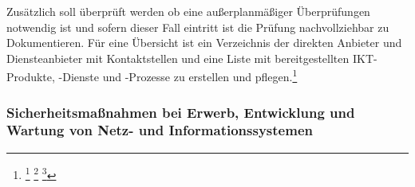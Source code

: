 \documentclass[11pt,a4paper,hidelinks]{article}   %
\begin{document}
Zusätzlich soll überprüft werden ob eine außerplanmäßiger Überprüfungen notwendig ist und sofern dieser Fall eintritt ist die Prüfung nachvollziehbar zu Dokumentieren. Für eine Übersicht ist ein Verzeichnis der direkten Anbieter und Diensteanbieter mit Kontaktstellen und eine Liste mit bereitgestellten IKT-Produkte, -Dienste und -Prozesse zu erstellen und pflegen.\footnote{
                \footcite[Vgl. Anhang, Nummer 5,][]{EU2024-2690}
                \footcite[Geschäftsbeziehungen sind dynamisch][]{MISSING}
                \footcite[Vgl. §30 Absatz 2, Nummer 4,][]{NIS2UmsuCG} 
            }

            \subsubsection{Sicherheitsmaßnahmen bei Erwerb, Entwicklung und Wartung von Netz- und Informationssystemen}
\end{document}
